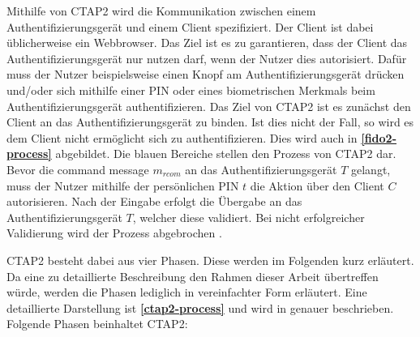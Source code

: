 Mithilfe von \ac{CTAP2} wird die Kommunikation zwischen einem Authentifizierungsgerät und einem Client spezifiziert. Der Client ist dabei üblicherweise ein Webbrowser. Das Ziel ist es zu garantieren, dass der Client das Authentifizierungsgerät nur nutzen darf, wenn der Nutzer dies autorisiert. Dafür muss der Nutzer beispielsweise einen Knopf am Authentifizierungsgerät drücken und/oder sich mithilfe einer PIN oder eines biometrischen Merkmals beim Authentifizierungsgerät authentifizieren. Das Ziel von \ac{CTAP2} ist es zunächst den Client an das Authentifizierungsgerät zu binden. Ist dies nicht der Fall, so wird es dem Client nicht ermöglicht sich zu authentifizieren. Dies wird auch in \textbf{\ref{fido2-process}} abgebildet. Die blauen Bereiche stellen den Prozess von \ac{CTAP2} dar. Bevor die command message $m_{rcom}$ an das Authentifizierungsgerät $T$ gelangt, muss der Nutzer mithilfe der persönlichen PIN $t$ die Aktion über den  Client $C$ autorisieren. Nach der Eingabe erfolgt die Übergabe an das Authentifizierungsgerät $T$, welcher diese validiert. Bei nicht erfolgreicher Validierung wird der Prozess abgebrochen \cite{barbosa2021provable}.

\ac{CTAP2} besteht dabei aus vier Phasen. Diese werden im Folgenden kurz erläutert. Da eine zu detaillierte Beschreibung den Rahmen dieser Arbeit übertreffen würde, werden die Phasen lediglich in vereinfachter Form erläutert. Eine detaillierte Darstellung ist \textbf{\ref{ctap2-process}} und wird in \cite{barbosa2021provable} genauer beschrieben. Folgende Phasen beinhaltet \ac{CTAP2}:

